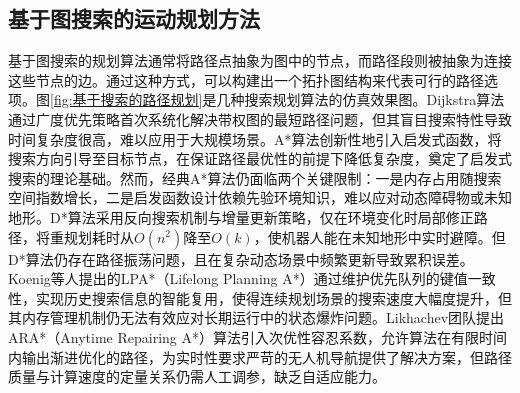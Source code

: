 \documentclass[master,academic]{ysuthesis} %
\begin{document}
		\subsection{基于图搜索的运动规划方法}
		基于图搜索的规划算法通常将路径点抽象为图中的节点，而路径段则被抽象为连接这些节点的边。通过这种方式，可以构建出一个拓扑图结构来代表可行的路径选项。图\ref{fig:基于搜索的路径规划}是几种搜索规划算法的仿真效果图。Dijkstra算法\cite{Dijstra1959}通过广度优先策略首次系统化解决带权图的最短路径问题，但其盲目搜索特性导致时间复杂度很高，难以应用于大规模场景。A*算法\cite{hart1968formal}创新性地引入启发式函数，将搜索方向引导至目标节点，在保证路径最优性的前提下降低复杂度，奠定了启发式搜索的理论基础。然而，经典A*算法仍面临两个关键限制：一是内存占用随搜索空间指数增长，二是启发函数设计依赖先验环境知识，难以应对动态障碍物或未知地形。D*算法\cite{stentz1994optimal}采用反向搜索机制与增量更新策略，仅在环境变化时局部修正路径，将重规划耗时从$O(n^2)$降至$O(k)$，使机器人能在未知地形中实时避障。但D*算法仍存在路径振荡问题，且在复杂动态场景中频繁更新导致累积误差。Koenig等人\cite{koenig2004lifelong}提出的LPA*（Lifelong Planning A*）通过维护优先队列的键值一致性，实现历史搜索信息的智能复用，使得连续规划场景的搜索速度大幅度提升，但其内存管理机制仍无法有效应对长期运行中的状态爆炸问题。Likhachev团队\cite{likhachev2003ara}提出ARA*（Anytime Repairing A*）算法引入次优性容忍系数，允许算法在有限时间内输出渐进优化的路径，为实时性要求严苛的无人机导航提供了解决方案，但路径质量与计算速度的定量关系仍需人工调参，缺乏自适应能力。
\end{document}
